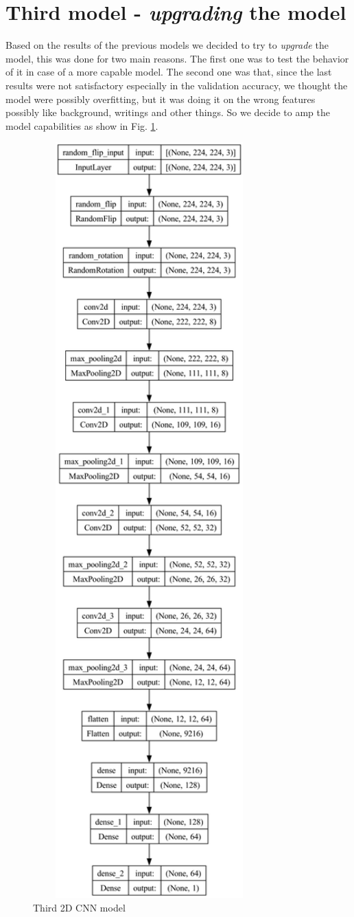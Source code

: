 \pagebreak
\section{Third model - \textit{upgrading} the model}
Based on the results of the previous models we decided to try to \textit{upgrade} the model, this was done for two main reasons. The first one was to test the behavior of it in case of a more capable model. The second one was that, since the last results were not satisfactory especially in the validation accuracy, we thought the model were possibly overfitting, but it was doing it on the wrong features possibly like background, writings and other things. So we decide to amp the model capabilities as show in Fig. \ref{fig:Third2DCNN}.
\begin{figure}[]
    \centering
    \includegraphics[width=0.8\textwidth, height=0.8\textwidth, keepaspectratio]{images/simple3augConv8_64Dense128_64nozoom.png}
    \caption{Third 2D CNN model}
    \label{fig:Third2DCNN}
\end{figure}


